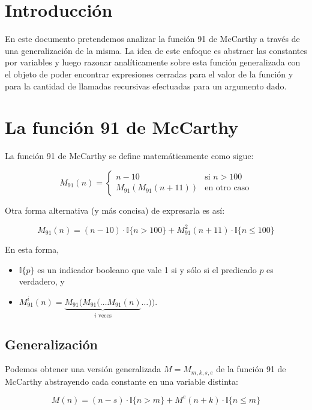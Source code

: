 \documentclass[a4paper,10pt]{article}
\newcommand{\Mc}[1]{\ensuremath{M_{91}(#1)}}
\newcommand{\Mci}[2]{\ensuremath{M_{91}^{#2}(#1)}}
\newcommand{\Mi}[2]{\ensuremath{M^{#2}(#1)}}
\newcommand{\Ind}[1]{\ensuremath{\mathbb{I}\{#1\}}}
\begin{document}
\pagestyle{fancyplain}
\cfoot{- \thepage/\pageref{LastPage} -}
\lhead{}
\chead{}
\rhead{}
\renewcommand{\headrulewidth}{0pt}

\section{Introducci\'on}

En este documento pretendemos analizar la funci\'on 91 de McCarthy a trav\'es de una generalizaci\'on
de la misma. La idea de este enfoque es abstraer las constantes por variables y luego razonar
anal\'iticamente sobre esta funci\'on generalizada con el objeto de poder encontrar expresiones
cerradas para el valor de la funci\'on y para la cantidad de llamadas recursivas efectuadas para un
argumento dado.

\section{La funci\'on 91 de McCarthy}

La funci\'on 91 de McCarthy se define matem\'aticamente como sigue:

$$
\Mc{n} =
    \begin{cases}
        n - 10            & \text{si } n > 100 \\
        \Mc{\Mc{n+11}}  & \text{en otro caso}
    \end{cases}
$$

Otra forma alternativa (y m\'as concisa) de expresarla es as\'i:

$$\Mc{n} = (n - 10) \cdot \Ind{n > 100} + \Mci{n+11}{2} \cdot \Ind{n \leq 100}$$

En esta forma,
\begin{itemize}
    \item $\Ind{p}$ es un indicador booleano que vale 1 si y s\'olo si el predicado $p$ es verdadero, y
    \item $\Mci{n}{i} = \underbrace{M_{91}(M_{91}(\dots \Mc{n}}_{i \text{ veces}}\dots))$.
\end{itemize}

\subsection{Generalizaci\'on}

Podemos obtener una versi\'on generalizada $M = M_{m,k,s,e}$ de la funci\'on 91 de McCarthy abstrayendo cada constante en
una variable distinta:

$$M(n) = (n - s) \cdot \Ind{n > m} + \Mi{n+k}{e} \cdot \Ind{n \leq m}$$
\end{document}
